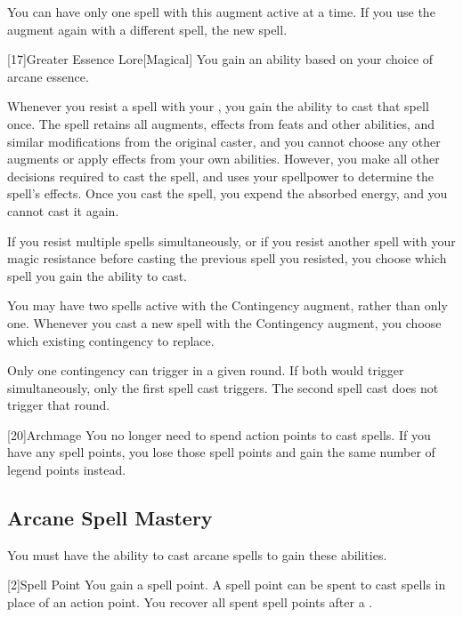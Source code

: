             You can have only one spell with this augment active at a time.
            If you use the augment again with a different spell, the new spell.

            [17]{Greater Essence Lore}[Magical]
            You gain an ability based on your choice of arcane essence.

             Whenever you resist a spell with your , you gain the ability to cast that spell once.
            The spell retains all augments, effects from feats and other abilities, and similar modifications from the original caster, and you cannot choose any other augments or apply effects from your own abilities.
            However, you make all other decisions required to cast the spell, and uses your spellpower to determine the spell's effects.
            Once you cast the spell, you expend the absorbed energy, and you cannot cast it again.

            If you resist multiple spells simultaneously, or if you resist another spell with your magic resistance before casting the previous spell you resisted, you choose which spell you gain the ability to cast.

             You may have two spells active with the Contingency augment, rather than only one.
            Whenever you cast a new spell with the Contingency augment, you choose which existing contingency to replace.

            Only one contingency can trigger in a given round.
            If both would trigger simultaneously, only the first spell cast triggers.
            The second spell cast does not trigger that round.

            [20]{Archmage}
            You no longer need to spend action points to cast spells.
            If you have any spell points, you lose those spell points and gain the same number of legend points instead.

        \subsection{Arcane Spell Mastery}
            You must have the ability to cast arcane spells to gain these abilities.

            [2]{Spell Point}
            You gain a spell point.
            A spell point can be spent to cast spells in place of an action point.
            You recover all spent spell points after a .

